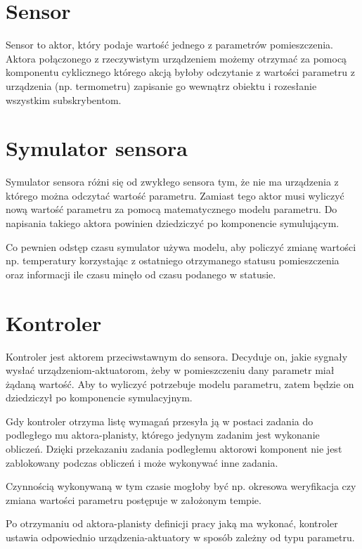 \section{Sensor}
Sensor to aktor, który podaje wartość jednego z parametrów pomieszczenia. Aktora połączonego z rzeczywistym urządzeniem możemy otrzymać za pomocą komponentu cyklicznego którego akcją byłoby odczytanie z wartości parametru z urządzenia (np. termometru) zapisanie go wewnątrz obiektu i rozesłanie wszystkim subskrybentom. 

\section{Symulator sensora}
Symulator sensora różni się od zwykłego sensora tym, że nie ma urządzenia z którego można odczytać wartość parametru. 
Zamiast tego aktor musi wyliczyć nową wartość parametru za pomocą matematycznego modelu parametru. Do napisania takiego aktora powinien dziedziczyć po komponencie symulującym. 

Co pewnien odstęp czasu symulator używa modelu, aby policzyć zmianę wartości np. temperatury korzystając z ostatniego otrzymanego statusu pomieszczenia oraz informacji ile czasu minęło od czasu podanego w statusie.

\section{Kontroler}
Kontroler jest aktorem przeciwstawnym do sensora. Decyduje on, jakie sygnały wysłać urządzeniom-aktuatorom, żeby w pomieszczeniu dany parametr miał żądaną wartość.
Aby to wyliczyć potrzebuje modelu parametru, zatem będzie on dziedziczył po komponencie symulacyjnym.

Gdy kontroler otrzyma listę wymagań przesyła ją w postaci zadania do podległego mu aktora-planisty, którego jedynym zadanim jest wykonanie obliczeń. Dzięki przekazaniu zadania podległemu aktorowi komponent nie jest zablokowany podczas obliczeń i może wykonywać inne zadania. 

Czynnością wykonywaną w tym czasie mogłoby być np. okresowa weryfikacja czy zmiana wartości parametru postępuje w założonym tempie.

Po otrzymaniu od aktora-planisty definicji pracy jaką ma wykonać, kontroler ustawia odpowiednio urządzenia-aktuatory w sposób zależny od typu parametru.
